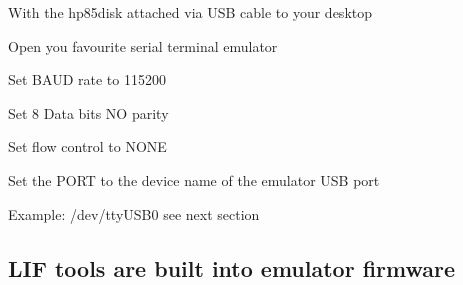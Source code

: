 \begin{DoxyItemize}
\item With the hp85disk attached via U\+SB cable to your desktop
\item Open you favourite serial terminal emulator
\begin{DoxyItemize}
\item Set B\+A\+UD rate to 115200
\item Set 8 Data bits NO parity
\item Set flow control to N\+O\+NE
\item Set the P\+O\+RT to the device name of the emulator U\+SB port
\begin{DoxyItemize}
\item Example\+: /dev/tty\+U\+S\+B0 see next section
\end{DoxyItemize}
\end{DoxyItemize}
\end{DoxyItemize}





\subsection*{L\+IF tools are built into emulator firmware}


